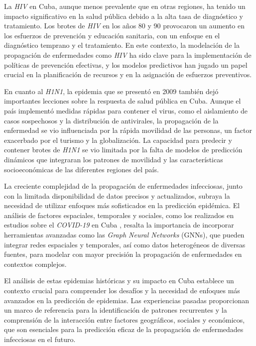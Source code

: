 La \textit{HIV} en Cuba, aunque menos prevalente que en otras regiones, ha tenido un impacto significativo en la salud pública debido a la alta tasa de diagnóstico y tratamiento. Los brotes de \textit{HIV} en los años 80 y 90 provocaron un aumento en los esfuerzos de prevención y educación sanitaria, con un enfoque en el diagnóstico temprano y el tratamiento. En este contexto, la modelación de la propagación de enfermedades como \textit{HIV} ha sido clave para la implementación de políticas de prevención efectivas, y los modelos predictivos han jugado un papel crucial en la planificación de recursos y en la asignación de esfuerzos preventivos.


En cuanto al \textit{H1N1}, la epidemia que se presentó en 2009 también dejó importantes lecciones sobre la respuesta de salud pública en Cuba. Aunque el país implementó medidas rápidas para contener el virus, como el aislamiento de casos sospechosos y la distribución de antivirales, la propagación de la enfermedad se vio influenciada por la rápida movilidad de las personas, un factor exacerbado por el turismo y la globalización. La capacidad para predecir y contener brotes de \textit{H1N1} se vio limitada por la falta de modelos de predicción dinámicos que integraran los patrones de movilidad y las características socioeconómicas de las diferentes regiones del país.


La creciente complejidad de la propagación de enfermedades infecciosas, junto con la limitada disponibilidad de datos precisos y actualizados, subraya la necesidad de utilizar enfoques más sofisticados en la predicción epidémica. El análisis de factores espaciales, temporales y sociales, como los realizados en estudios sobre el \textit{COVID-19} en Cuba \textcite{Matamoros2020EntradaDV, mas2020covid}, resalta la importancia de incorporar herramientas avanzadas como las \textit{Graph Neural Networks} (GNNs), que pueden integrar redes espaciales y temporales, así como datos heterogéneos de diversas fuentes, para modelar con mayor precisión la propagación de enfermedades en contextos complejos.


El análisis de estas epidemias históricas y su impacto en Cuba establece un contexto crucial para comprender los desafíos y la necesidad de enfoques más avanzados en la predicción de epidemias. Las experiencias pasadas proporcionan un marco de referencia para la identificación de patrones recurrentes y la comprensión de la interacción entre factores geográficos, sociales y económicos, que son esenciales para la predicción eficaz de la propagación de enfermedades infecciosas en el futuro.


